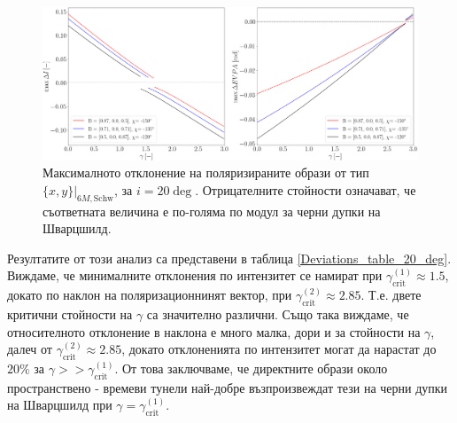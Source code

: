 \begin{figure}[!htb]
		\centering
		\includegraphics[scale = 0.22]{WH_20_deg_param_sweep.png}
		\caption[Максималното отклонение на поляризираните образи от тип $\{x,y\}\vert_{6M, \text{Schw}}$, за $i = 20\deg$]{\small Максималното отклонение на поляризираните образи от тип $\{x,y\}\vert_{6M, \text{Schw}}$, за $i = 20\deg$. Отрицателните стойности означават, че съответната величина е по-голяма по модул за черни дупки на Шварцшилд.} 
		\label{WH_max_deviation_20_deg}
\end{figure}
 Резултатите от този анализ са представени в таблица \ref{Deviations_table_20_deg}. Виждаме, че минималните отклонения по интензитет се намират при $\gamma_\text{crit}^{(1)}\approx 1.5$, докато по наклон на поляризационнинят вектор, при $\gamma_\text{crit}^{(2)}\approx 2.85$. Т.е. двете критични стойности на $\gamma$ са значително различни. Също така виждаме, че относителното отклонение в наклона е много малка, дори и за стойности на $\gamma$, далеч от $\gamma_\text{crit}^{(2)}\approx 2.85$, докато отклоненията по интензитет могат да нарастат до $20\%$ за $\gamma >> \gamma_\text{crit}^{(1)}$. От това заключваме, че директните образи около пространствено - времеви тунели най-добре възпроизвеждат тези на черни дупки на Шварцшилд при $\gamma = \gamma_\text{crit}^{(1)}$.
